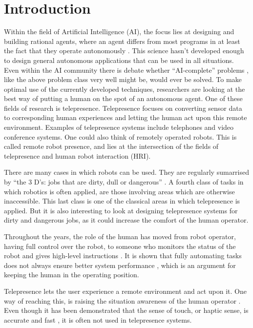 \section{Introduction}
Within the field of Artificial Intelligence (AI), the focus lies at designing and building rational agents, where an agent differs from most programs in at least the fact that they operate autonomously \cite[p.4]{Russel2003}.  This science hasn't developed enough to design general autonomous applications that can be used in all situations.  Even within the AI community there is debate whether ``AI-complete'' problems \cite[p.738]{Jurafsky2000}, like the above problem class very well might be,  would ever be solved.  To make optimal use of the currently developed techniques, researchers are looking at the best way of putting a human on the spot of an autonomous agent.  One of these fields of research is telepresence.  Telepresence focuses on converting sensor data to corresponding human experiences and letting the human act upon this remote environment.  Examples of telepresence systems include telephones and video conference systems. One could also think of remotely operated robots.  This is called remote robot presence, and lies at the intersection of the fields of telepresence and human robot interaction (HRI).

There are many cases in which robots can be used. They are regularly sumarrised by ``the 3 D's: jobs that are dirty, dull or dangerous'' \cite[p.6]{Murphy2000}.  A fourth class of tasks in which robotics is often applied, are those involving areas which are otherwise inaccessible. This last class is one of the classical areas in which telepresence is applied.  But it is also interesting to look at designing telepresence systems for dirty and dangerous jobs, as it could increase the comfort of the human operator.

Throughout the years, the role of the human has moved from robot operator, having full control over the robot, to someone who monitors the status of the robot and gives high-level instructions \cite{VanErp2006}.  It is shown that fully automating tasks does not always ensure better system performance \cite{VanErp2000}, which is an argument for keeping the human in the operating position.

Telepresence lets the user experience a remote environment and act upon it.  One way of reaching this, is raising the situation awareness of the human operator \cite{Endsley1988,VanErp2006}.  Even though it has been demonstrated that the sense of touch, or haptic sense, is accurate and fast \cite{Klatzky1985}, it is often not used in telepresence systems.  

